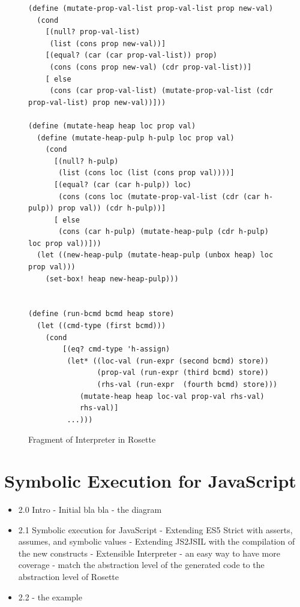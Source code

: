 \begin{figure}
\begin{lstlisting}
(define (mutate-prop-val-list prop-val-list prop new-val)
  (cond
    [(null? prop-val-list)
     (list (cons prop new-val))]
    [(equal? (car (car prop-val-list)) prop)
     (cons (cons prop new-val) (cdr prop-val-list))]
    [ else
     (cons (car prop-val-list) (mutate-prop-val-list (cdr prop-val-list) prop new-val))]))

(define (mutate-heap heap loc prop val)
  (define (mutate-heap-pulp h-pulp loc prop val)
    (cond
      [(null? h-pulp)
       (list (cons loc (list (cons prop val))))]
      [(equal? (car (car h-pulp)) loc)
       (cons (cons loc (mutate-prop-val-list (cdr (car h-pulp)) prop val)) (cdr h-pulp))]
      [ else
       (cons (car h-pulp) (mutate-heap-pulp (cdr h-pulp) loc prop val))]))
  (let ((new-heap-pulp (mutate-heap-pulp (unbox heap) loc prop val)))
    (set-box! heap new-heap-pulp)))


(define (run-bcmd bcmd heap store)
  (let ((cmd-type (first bcmd)))
    (cond
    	[(eq? cmd-type 'h-assign)
      	 (let* ((loc-val (run-expr (second bcmd) store))
                (prop-val (run-expr (third bcmd) store))
                (rhs-val (run-expr  (fourth bcmd) store)))
            (mutate-heap heap loc-val prop-val rhs-val)
            rhs-val)]
         ...)))
\end{lstlisting}
\caption{Fragment of \jsil Interpreter in Rosette}
\end{figure}


\section{Symbolic Execution for JavaScript}

\begin{itemize}
   \item 2.0 Intro - Initial bla bla - the diagram 
   \item 2.1 Symbolic execution for JavaScript 
              - Extending ES5 Strict with asserts, assumes, and symbolic values
              - Extending JS2JSIL with the compilation of the new constructs 
              - Extensible Interpreter 
                   - an easy way to have more coverage 
                   - match the abstraction level of the generated code to the abstraction level of Rosette 
    \item 2.2 - the example 
\end{itemize}

